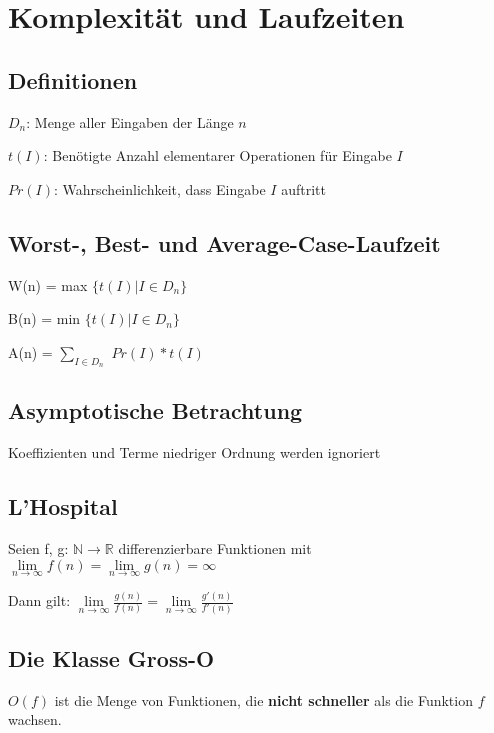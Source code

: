 \documentclass[12pt]{article}
\begin{document}
\parindent=0pt

\tableofcontents
\clearpage
{}

\section{Komplexität und Laufzeiten}

\subsection{Definitionen}
$D_n$: Menge aller Eingaben der Länge $n$

$t(I)$: Benötigte Anzahl elementarer Operationen für Eingabe $I$

$Pr(I)$: Wahrscheinlichkeit, dass Eingabe $I$ auftritt

\subsection{Worst-, Best- und Average-Case-Laufzeit}

W(n) = max $\{ t(I) | I \in D_n \}$

B(n) = min $\{ t(I) | I \in D_n \}$

A(n) = $\sum_{I \in D_{n}}$ $Pr(I) * t(I)$

\subsection{Asymptotische Betrachtung}

Koeffizienten und Terme niedriger Ordnung werden ignoriert

\subsection{L'Hospital}

Seien f, g: $\mathbb{N} \to \mathbb{R}$ differenzierbare Funktionen mit \(\lim\limits_{n \to \infty}f(n)=\lim\limits_{n \to \infty}g(n)=\infty\)

Dann gilt: \(\lim\limits_{n \to \infty}\frac{g(n)}{f(n)}=\lim\limits_{n \to \infty}\frac{g'(n)}{f'(n)}\)

\subsection{Die Klasse Gross-O}

$O(f)$ ist die Menge von Funktionen, die \textbf{nicht schneller} als die Funktion $f$ wachsen.
\end{document}
